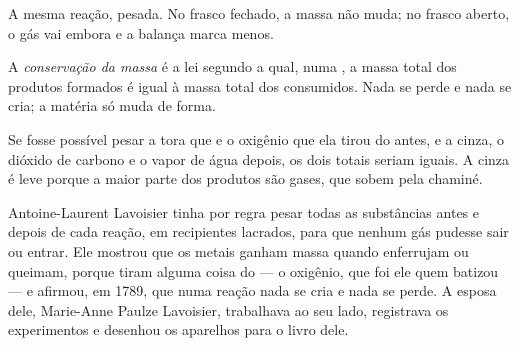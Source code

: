 \begin{omfigure}

{\small A mesma reação, pesada. No frasco fechado, a massa não muda; no
frasco aberto, o gás vai embora e a balança marca menos.}
\end{omfigure}

\begin{definition}\label{def:g8:balanced-equations:conservation}
A \emph{conservação da massa} é a lei segundo
a qual, numa , a massa total dos produtos formados é igual
à massa total dos  consumidos. Nada se perde e nada se cria; a
matéria só muda de forma.
\end{definition}

\begin{example}\label{ex:g8:balanced-equations:log}
Se fosse possível pesar a tora que  e o oxigênio que ela tirou do
 antes, e a cinza, o dióxido de carbono e o vapor de água depois, os
dois totais seriam iguais. A cinza é leve porque a maior parte dos
produtos são gases, que sobem pela chaminé.
\end{example}

\begin{history}
Antoine-Laurent Lavoisier tinha por regra pesar todas as substâncias
antes e depois de cada reação, em recipientes lacrados, para que nenhum
gás pudesse sair ou entrar. Ele mostrou que os metais ganham massa
quando enferrujam ou queimam, porque tiram alguma coisa do  --- o
oxigênio, que foi ele quem batizou --- e afirmou, em 1789, que numa
reação nada se cria e nada se perde. A esposa dele, Marie-Anne Paulze
Lavoisier, trabalhava ao seu lado, registrava os experimentos e
desenhou os aparelhos para o livro dele.
\end{history}

